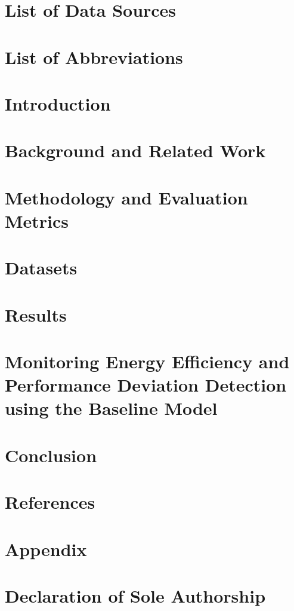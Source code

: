 \documentclass[12pt, letterpaper]{article}
\begin{document}



\pagebreak

\tableofcontents
\pagebreak
\listoffigures
\listoftables
\pagebreak

\section*{List of Data Sources}

\pagebreak

\section*{List of Abbreviations}

\pagebreak

\section{Introduction}

\pagebreak

\section{Background and Related Work}

\pagebreak

\section{Methodology and Evaluation Metrics}

\pagebreak

\section{Datasets}

\pagebreak

\section{Results}

\pagebreak

\section{Monitoring Energy Efficiency and Performance Deviation Detection using the Baseline Model}

\pagebreak

\section{Conclusion}

\pagebreak

\section{References}
\printbibliography[heading=none]
\pagebreak

\appendix
\section{Appendix}

\pagebreak

\section*{Declaration of Sole Authorship}

\end{document}
